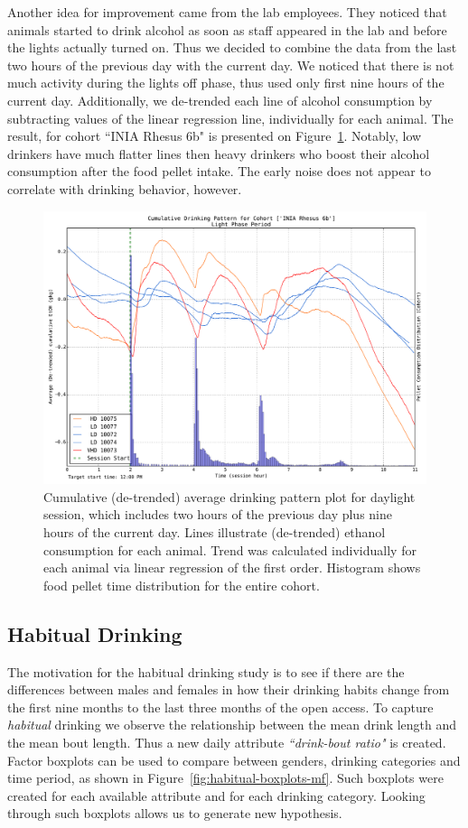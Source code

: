	Another idea for improvement came from the lab employees. They noticed that animals started to drink alcohol as soon as staff appeared in the lab and before the lights actually turned on. Thus we decided to combine the data from the last two hours of the previous day with the current day. We noticed that there is not much activity during the lights off phase, thus used only first nine hours of the current day. Additionally, we de-trended each line of alcohol consumption by subtracting values of the linear regression line, individually for each animal. The result, for cohort ``INIA Rhesus 6b" is presented on Figure~\ref{fig:dp-dl}. Notably, low drinkers have much flatter lines then heavy drinkers who boost their alcohol consumption after the food pellet intake. The early noise does not appear to correlate with drinking behavior, however. 
	
	\begin{figure}[ht]		
		\centering
		\includegraphics[width=0.98\linewidth]{figures/dp_r6b_f_lights.pdf}
		\caption{Cumulative (de-trended) average drinking pattern plot for daylight session, which includes two hours of the previous day plus nine hours of the current day. Lines illustrate (de-trended) ethanol consumption for each animal. Trend was calculated individually for each animal via linear regression of the first order. Histogram shows food pellet time distribution for the entire cohort.}
		\label{fig:dp-dl}
	\end{figure}
	
		
	\subsection{Habitual Drinking}
	The motivation for the habitual drinking study is to see if there are the differences between males and females in how their drinking habits change from the first nine months to the last three months of the open access. To capture \textit{habitual} drinking we observe the relationship between the mean drink length and the mean bout length. Thus a new daily attribute \textit{``drink-bout ratio"} is created. Factor boxplots can be used to compare between genders, drinking categories and time period, as shown in Figure~\ref{fig:habitual-boxplots-mf}. Such boxplots were created for each available attribute and for each drinking category. Looking through such boxplots allows us to generate new hypothesis.
	
